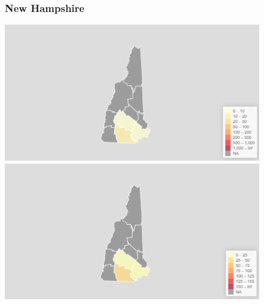 \documentclass[11pt]{article}
\begin{document}
\begin{landscape}
\thispagestyle{empty}
\begin{figure}[h]
\subsubsection*{New Hampshire}
\hspace*{-3cm}
\begin{minipage}{.8\textwidth}
    \includegraphics[width=.95\textwidth]{ImageResults/NewHampshireTotal.PNG}
\end{minipage}%
\begin{minipage}{.8\textwidth}
    \includegraphics[width=.95\textwidth]{ImageResults/NewHampshire100k.PNG}
\end{minipage}

\end{figure}
\end{landscape}
\end{document}
